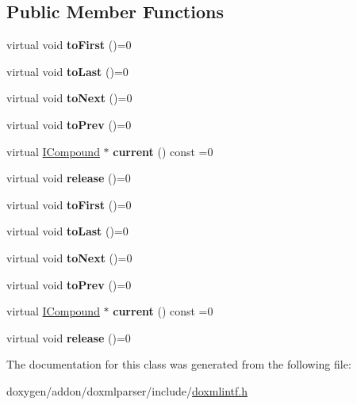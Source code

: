 \subsection*{Public Member Functions}
\begin{DoxyCompactItemize}
\item 
\mbox{\label{class_i_compound_iterator_afeedd038aee7af106664cca550f0c9b7}} 
virtual void {\bfseries to\+First} ()=0
\item 
\mbox{\label{class_i_compound_iterator_a9344ff9c3e0574b9da3240fc21a43d88}} 
virtual void {\bfseries to\+Last} ()=0
\item 
\mbox{\label{class_i_compound_iterator_a9b4c1b65d047fcc32508f227ba6929bf}} 
virtual void {\bfseries to\+Next} ()=0
\item 
\mbox{\label{class_i_compound_iterator_a424b2507309eb8780c9f37ad2969e518}} 
virtual void {\bfseries to\+Prev} ()=0
\item 
\mbox{\label{class_i_compound_iterator_abd7c76572bec8cb0134806c6996248c3}} 
virtual \mbox{\hyperlink{class_i_compound}{I\+Compound}} $\ast$ {\bfseries current} () const =0
\item 
\mbox{\label{class_i_compound_iterator_ac794e88582cb85cf13a355b907e88cea}} 
virtual void {\bfseries release} ()=0
\item 
\mbox{\label{class_i_compound_iterator_afeedd038aee7af106664cca550f0c9b7}} 
virtual void {\bfseries to\+First} ()=0
\item 
\mbox{\label{class_i_compound_iterator_a9344ff9c3e0574b9da3240fc21a43d88}} 
virtual void {\bfseries to\+Last} ()=0
\item 
\mbox{\label{class_i_compound_iterator_a9b4c1b65d047fcc32508f227ba6929bf}} 
virtual void {\bfseries to\+Next} ()=0
\item 
\mbox{\label{class_i_compound_iterator_a424b2507309eb8780c9f37ad2969e518}} 
virtual void {\bfseries to\+Prev} ()=0
\item 
\mbox{\label{class_i_compound_iterator_abd7c76572bec8cb0134806c6996248c3}} 
virtual \mbox{\hyperlink{class_i_compound}{I\+Compound}} $\ast$ {\bfseries current} () const =0
\item 
\mbox{\label{class_i_compound_iterator_ac794e88582cb85cf13a355b907e88cea}} 
virtual void {\bfseries release} ()=0
\end{DoxyCompactItemize}


The documentation for this class was generated from the following file\+:\begin{DoxyCompactItemize}
\item 
doxygen/addon/doxmlparser/include/\mbox{\hyperlink{include_2doxmlintf_8h}{doxmlintf.\+h}}\end{DoxyCompactItemize}
